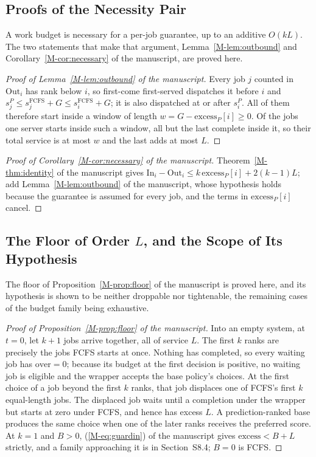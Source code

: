 \documentclass[mathematics,supfile,submit,moreauthors]{Definitions/mdpi}
\begin{document}
\subsection{Proofs of the Necessity Pair}
\label{sec:supp_necessity}

A work budget is necessary for a per-job guarantee, up to an additive $O(kL)$. The two
statements that make that argument, Lemma~\ref*{M-lem:outbound} and Corollary~\ref*{M-cor:necessary} of the manuscript, are
proved here.

\begin{proof}[Proof of Lemma~\ref*{M-lem:outbound} of the manuscript]
Every job $j$ counted in $\mathrm{Out}_i$ has rank below $i$, so first-come
first-served dispatches it before $i$ and $s^P_j \le s^{\mathrm{FCFS}}_j + G \le
s^{\mathrm{FCFS}}_i + G$; it is also dispatched at or after $s^P_i$. All of them
therefore start inside a window of length
$w = G - \mathrm{excess}_P[i] \ge 0$. Of the jobs one server starts inside
such a window, all but the last complete inside it, so their total service is at
most $w$ and the last adds at most $L$.
\end{proof}

\begin{proof}[Proof of Corollary~\ref*{M-cor:necessary} of the manuscript]
Theorem~\ref*{M-thm:identity} of the manuscript gives
$\mathrm{In}_i - \mathrm{Out}_i \le k\,\mathrm{excess}_P[i] + 2(k-1)L$; add
Lemma~\ref*{M-lem:outbound} of the manuscript, whose hypothesis holds because the guarantee is
assumed for every job, and the terms in $\mathrm{excess}_P[i]$ cancel.
\end{proof}

\subsection{The Floor of Order \texorpdfstring{$L$}{L}, and the Scope of Its Hypothesis}
\label{sec:supp_floorscope}

The floor of Proposition~\ref*{M-prop:floor} of the manuscript is proved here, and its hypothesis is shown
to be neither droppable nor tightenable, the remaining cases of the budget family being
exhaustive.

\begin{proof}[Proof of Proposition~\ref*{M-prop:floor} of the manuscript]
Into an empty system, at $t=0$, let $k+1$ jobs arrive together, all of service
$L$. The first $k$ ranks are precisely the jobs FCFS starts at once. Nothing has
completed, so every waiting job has $\mathrm{over}=0$; because its budget at the first
decision is positive, no waiting job is eligible and the wrapper accepts the base
policy's choices. At the first choice of a job beyond the first $k$ ranks, that
job displaces one of FCFS's first $k$ equal-length jobs. The displaced job waits
until a completion under the wrapper but starts at zero under FCFS, and hence has
excess $L$. A prediction-ranked base produces the same choice when one of the
later ranks receives the preferred score. At $k=1$ and $B>0$,
(\ref*{M-eq:guardin}) of the manuscript gives $\mathrm{excess}<B+L$ strictly, and a family approaching
it is in Section~S8.4; $B=0$ is FCFS.
\end{proof}
\end{document}
